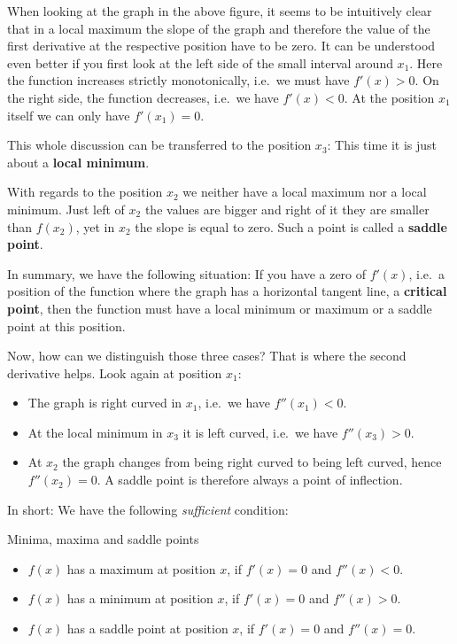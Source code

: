 \documentclass[12pt,eng]{skript_ogg}
\begin{document}
When looking at the graph in the above figure, it seems to be intuitively clear that in a local maximum the slope of the graph and therefore the value of the first derivative at the respective position have to be zero. It can be understood even better if you first look at the left side of the small interval around $x_1$. Here the function increases strictly monotonically, i.e.\ we must have $f'(x)>0$. On the right side, the function decreases, i.e.\ we have $f'(x)<0$. At the position $x_1$ itself we can only have $f'(x_1)=0$.

This whole discussion can be transferred to the position $x_3$: This time it is just about a \textbf{local minimum}.

With regards to the position $x_2$ we neither have a local maximum nor a local minimum. Just left of $x_2$ the values are bigger and right of it they are smaller than $f(x_2)$, yet in $x_2$ the slope is equal to zero. Such a point is called a \textbf{saddle point}.

\newpage

In summary, we have the following situation: If you have a zero of $f'(x)$, i.e.\ a position of the function where the graph has a horizontal tangent line, a \textbf{critical point}, then the function must have a local minimum or maximum or a saddle point at this position.

Now, how can we distinguish those three cases? That is where the second derivative helps. Look again at position $x_1$:
\begin{itemize}
	\item The graph is right curved in $x_1$, i.e.\ we have $f''(x_1)<0$.
	\item At the local minimum in $x_3$ it is left curved, i.e.\ we have $f''(x_3)>0$.
	\item At $x_2$ the graph changes from being right curved to being left curved, hence $f''(x_2)=0$. A saddle point is therefore always a point of inflection.
\end{itemize}

In short: We have the following \emph{sufficient} condition:

\begin{satz} Minima, maxima and saddle points

\begin{itemize}
\item $f(x)$ has a maximum at position $x$, if $f'(x)=0$ and $f''(x)<0$.
\item $f(x)$ has a minimum at position $x$, if $f'(x)=0$ and $f''(x)>0$.
\item $f(x)$ has a saddle point at position $x$, if $f'(x)=0$ and $f''(x)=0$.
\end{itemize}
\end{satz}
\end{document}
